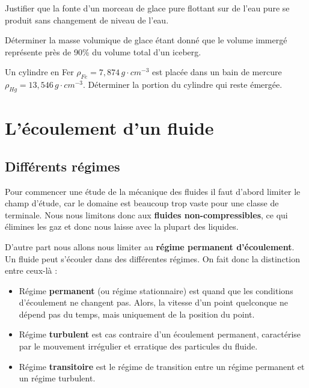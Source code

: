 \documentclass[11pt,a4paper]{article}
\begin{document}
\begin{exo}
Justifier que la fonte d'un morceau de glace pure flottant sur de l'eau pure se produit sans changement de niveau de l'eau.
\vspace{3.5cm}

\end{exo}
\begin{exo}
Déterminer la masse volumique de glace étant donné que le volume immergé représente près de 90\% du volume total d'un iceberg. 
\vspace{4cm}
\end{exo}

\begin{exo}
Un cylindre en Fer $\rho_{Fe} = 7,874\,g\cdot cm^{-3}$ est placée dans un bain de mercure $\rho_{Hg} = 13,546\,g\cdot cm^{-3}$. Déterminer la portion du cylindre qui reste émergée. 
\vspace{4cm}
\end{exo}

\section{L'écoulement d'un fluide}

\subsection{Différents régimes}

Pour commencer une étude de la mécanique des fluides il faut d'abord limiter le champ d'étude, car le domaine est beaucoup trop vaste pour une classe de terminale. Nous nous limitons donc aux \textbf{fluides non-compressibles}, ce qui élimines les gaz et donc nous laisse avec la plupart des liquides.  

D'autre part nous allons nous limiter au \textbf{régime permanent d'écoulement}. Un fluide peut s'écouler dans des différentes régimes. On fait donc la distinction entre ceux-là : 
\begin{itemize}
    \item Régime \textbf{permanent} (ou régime stationnaire) est quand que les conditions d'écoulement ne changent pas. Alors, la vitesse d'un point quelconque ne dépend pas du temps, mais uniquement de la position du point. 
    \item Régime \textbf{turbulent} est cas contraire d'un écoulement permanent, caractérise par le mouvement irrégulier et erratique des particules du fluide. 
    \item Régime \textbf{transitoire} est le régime de transition entre un régime permanent et un régime turbulent. 
\end{itemize}
\end{document}
